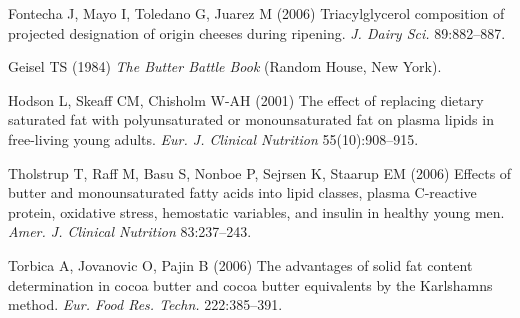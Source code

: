 \documentclass[opre,nonblindrev]{informs3} %
\begin{document}
\begin{thebibliography}{}
Fontecha J, Mayo I, Toledano G, Juarez M (2006)
Triacylglycerol composition  of projected designation
of origin cheeses during ripening. {\it J. Dairy Sci.} 89:882--887.

Geisel TS (1984) {\it The Butter Battle Book\/} (Random House, New York).

Hodson L, Skeaff CM, Chisholm W-AH (2001) The effect of
replacing dietary saturated fat with polyunsaturated or
monounsaturated fat on plasma lipids in free-living young adults.
{\it Eur. J. Clinical Nutrition} 55(10):908--915.

Tholstrup T, Raff M, Basu S, Nonboe P, Sejrsen K, Staarup EM (2006) 
Effects of butter and mono\-un\-saturated fatty acids
into lipid classes, plasma C-reactive protein, oxidative stress,
hemostatic variables, and insulin in healthy young men. {\it Amer. J.
Clinical Nutrition} 83:237--243.

Torbica A, Jovanovic O, Pajin B (2006) The advantages of solid
fat content determination in cocoa butter and cocoa butter
equivalents by the Karlshamns method. {\it Eur. Food Res. Techn.} 222:385--391.

\end{thebibliography}
\end{document}
